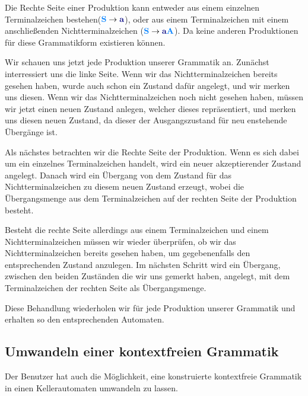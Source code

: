 Die Rechte Seite einer Produktion kann entweder aus einem einzelnen
Terminalzeichen bestehen($\NonterminalSymbol{S} \to \TerminalSymbol{a}$), oder
aus einem Terminalzeichen mit einem anschließenden Nichtterminalzeichen
($\NonterminalSymbol{S} \to \TerminalSymbol{a}\NonterminalSymbol{A}$). Da keine
anderen Produktionen für diese Grammatikform existieren können.\vspace{10pt}

Wir schauen uns jetzt jede Produktion unserer Grammatik an.
Zunächst interressiert uns die linke Seite. Wenn wir das Nichtterminalzeichen
bereits gesehen haben, wurde auch schon ein Zustand dafür angelegt, und wir
merken uns diesen. Wenn wir das Nichtterminalzeichen noch nicht gesehen haben,
müssen wir jetzt einen neuen Zustand anlegen, welcher dieses repräsentiert, und
merken uns diesen neuen Zustand, da dieser der Ausgangszustand
für neu enstehende Übergänge ist.\vspace{10pt}

Als nächstes betrachten wir die Rechte Seite der Produktion. Wenn es sich dabei
um ein einzelnes Terminalzeichen handelt, wird ein neuer akzeptierender Zustand
angelegt. Danach wird ein Übergang von dem Zustand für das Nichtterminalzeichen
zu diesem neuen Zustand erzeugt, wobei die Übergangsmenge aus dem
Terminalzeichen auf der rechten Seite der Produktion besteht.\vspace{10pt}

Besteht die rechte Seite allerdings aus einem Terminalzeichen und einem
Nichtterminalzeichen müssen wir wieder überprüfen, ob wir das
Nichtterminalzeichen bereits gesehen haben, um gegebenenfalls den
entsprechenden Zustand anzulegen. Im nächsten Schritt wird ein Übergang,
zwischen den beiden Zuständen die wir uns gemerkt haben, angelegt, mit dem
Terminalzeichen der rechten Seite als Übergangsmenge.\vspace{10pt}

Diese Behandlung wiederholen wir für jede Produktion unserer Grammatik und
erhalten so den entsprechenden Automaten.\vspace{10pt}

\subsection{Umwandeln einer kontextfreien
Grammatik}\label{ConverToGrammarContextFree}

Der Benutzer hat auch die Möglichkeit, eine konstruierte kontextfreie Grammatik
in einen Kellerautomaten umwandeln zu lassen.\vspace{10pt}

